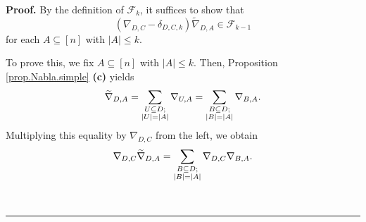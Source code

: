 \documentclass[numbers=enddot,12pt,final,onecolumn,notitlepage]{scrartcl}%
\numberwithin{exer}{subsection}
\theoremstyle{definition}
\newenvironment{proof}[1][Proof]{\noindent\textbf{#1.} }{\ \rule{0.5em}{0.5em}}
\let\sumnonlimits\sum
\renewcommand{\sum}{\sumnonlimits\limits}
\begin{document}
\begin{proof}
By the definition of $\mathcal{F}_{k}$, it suffices to show that
\begin{equation}
\left(  \nabla_{D,C}-\delta_{D,C,k}\right)  \widetilde{\nabla}_{D,A}%
\in\mathcal{F}_{k-1} \label{pf.prop.Fk.1.goal}%
\end{equation}
for each $A\subseteq\left[  n\right]  $ with $\left\vert A\right\vert \leq k$.

To prove this, we fix $A\subseteq\left[  n\right]  $ with $\left\vert
A\right\vert \leq k$. Then, Proposition \ref{prop.Nabla.simple} \textbf{(c)}
yields%
\begin{equation}
\widetilde{\nabla}_{D,A}=\sum\limits_{\substack{U\subseteq D;\\\left\vert
U\right\vert =\left\vert A\right\vert }}\nabla_{U,A}=\sum
\limits_{\substack{B\subseteq D;\\\left\vert B\right\vert =\left\vert
A\right\vert }}\nabla_{B,A}. \label{pf.prop.Fk.1.3}%
\end{equation}
Multiplying this equality by $\nabla_{D,C}$ from the left, we obtain%
\begin{equation}
\nabla_{D,C}\widetilde{\nabla}_{D,A}=\sum\limits_{\substack{B\subseteq
D;\\\left\vert B\right\vert =\left\vert A\right\vert }}\nabla_{D,C}%
\nabla_{B,A}. \label{pf.prop.Fk.1.3m}%
\end{equation}



\end{proof}
\end{document}
